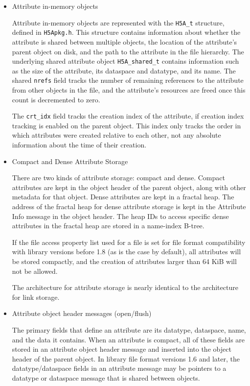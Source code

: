 \begin{itemize}
    \item Attribute in-memory objects

Attribute in-memory objects are represented with the \texttt{H5A\_t} structure, defined in \texttt{H5Apkg.h}. This structure contains information about whether the attribute is shared between multiple objects, the location of the attribute's parent object on disk, and the path to the attribute in the file hierarchy. The underlying shared attribute object \texttt{H5A\_shared\_t} contains information such as the size of the attribute, its dataspace and datatype, and its name. The shared \texttt{nrefs} field tracks the number of remaining references to the attribute from other objects in the file, and the attribute's resources are freed once this count is decremented to zero. 

The \texttt{crt\_idx} field tracks the creation index of the attribute, if creation index tracking is enabled on the parent object. This index only tracks the order in which attributes were created relative to each other, not any absolute information about the time of their creation.

    \item Compact and Dense Attribute Storage

There are two kinds of attribute storage: compact and dense. Compact attributes are kept in the object header of the parent object, along with other metadata for that object. Dense attributes are kept in a fractal heap. The address of the fractal heap for dense attribute storage is kept in the Attribute Info message in the object header. The heap IDs to access specific dense attributes in the fractal heap are stored in a name-index B-tree. 

If the file access property list used for a file is set for file format compatibility with library versions before 1.8 (as is the case by default), all attributes will be stored compactly, and the creation of attributes larger than 64 KiB will not be allowed.

The architecture for attribute storage is nearly identical to the architecture for link storage.

    \item Attribute object header messages (open/flush)

The primary fields that define an attribute are its datatype, dataspace, name, and the data it contains. When an attribute is compact, all of these fields are stored in an attribute object header message and inserted into the object header of the parent object. In library file format versions 1.6 and later, the datatype/dataspace fields in an attribute message may be pointers to a datatype or dataspace message that is shared between objects.


\end{itemize}
